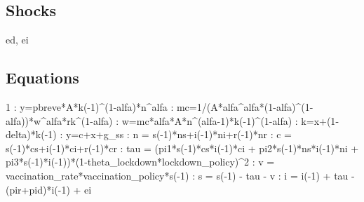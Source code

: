 \documentclass{article}%
\begin{document}
%
\subsection{Shocks}%
\label{subsec:Shocks}%
ed, ei

%
\subsection{Equations}%
\label{subsec:Equations}%
1    :  y=pbreve*A*k({-}1)\^{}(1{-}alfa)*n\^{}alfa\newline%
    :  mc=1/(A*alfa\^{}alfa*(1{-}alfa)\^{}(1{-}alfa))*w\^{}alfa*rk\^{}(1{-}alfa)\newline%
    :  w=mc*alfa*A*n\^{}(alfa{-}1)*k({-}1)\^{}(1{-}alfa)\newline%
    :  k=x+(1{-}delta)*k({-}1)\newline%
    :  y=c+x+g\_ss\newline%
    :  n = s({-}1)*ns+i({-}1)*ni+r({-}1)*nr\newline%
    :  c = s({-}1)*cs+i({-}1)*ci+r({-}1)*cr\newline%
    :  tau = (pi1*s({-}1)*cs*i({-}1)*ci + pi2*s({-}1)*ns*i({-}1)*ni + pi3*s({-}1)*i({-}1))*(1{-}theta\_lockdown*lockdown\_policy)\^{}2\newline%
    :  v = vaccination\_rate*vaccination\_policy*s({-}1)\newline%
   :  s = s({-}1) {-} tau {-} v\newline%
   :  i = i({-}1) + tau {-} (pir+pid)*i({-}1) + ei\newline%
\end{document}
